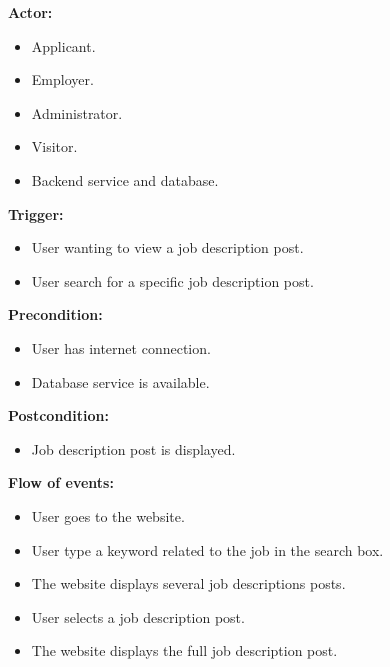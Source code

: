 \documentclass[a4paper]{article}
\begin{document}
        \textbf{Actor:}
        \begin{itemize}
            \item Applicant.
            \item Employer.
            \item Administrator.
            \item Visitor.
            \item Backend service and database.
        \end{itemize}

        \textbf{Trigger:}
        \begin{itemize}
            \item User wanting to view a job description post.
            \item User search for a specific job description post.
        \end{itemize}

        \textbf{Precondition:}
        \begin{itemize}
            \item User has internet connection.
            \item Database service is available.
        \end{itemize}

        \textbf{Postcondition:}
        \begin{itemize}
            \item Job description post is displayed.
        \end{itemize}

        \textbf{Flow of events:}
        \begin{itemize}
            \item User goes to the website.
            \item User type a keyword related to the job in the search box.
            \item The website displays several job descriptions posts.
            \item User selects a job description post.
            \item The website displays the full job description post.
        \end{itemize}
\end{document}
